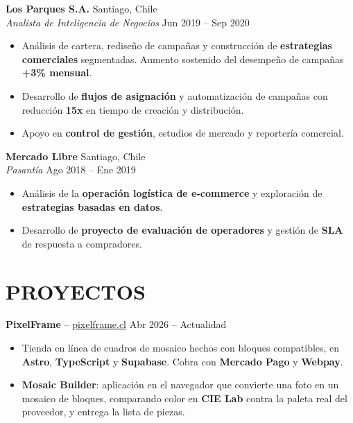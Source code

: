 \documentclass[a4paper,10.5pt]{extarticle}
\begin{document}
\vspace{4pt}

\textbf{Los Parques S.A.} \hfill Santiago, Chile\\
\textit{Analista de Inteligencia de Negocios} \hfill Jun 2019 -- Sep 2020
\begin{itemize}
    \item Análisis de cartera, rediseño de campañas y construcción de \textbf{estrategias comerciales} segmentadas. Aumento sostenido del desempeño de campañas \textbf{+3\% mensual}.
    \item Desarrollo de \textbf{flujos de asignación} y automatización de campañas con reducción \textbf{15x} en tiempo de creación y distribución.
    \item Apoyo en \textbf{control de gestión}, estudios de mercado y reportería comercial.
\end{itemize}

\vspace{4pt}

\textbf{Mercado Libre} \hfill Santiago, Chile\\
\textit{Pasantía} \hfill Ago 2018 -- Ene 2019
\begin{itemize}
    \item Análisis de la \textbf{operación logística de e-commerce} y exploración de \textbf{estrategias basadas en datos}.
    \item Desarrollo de \textbf{proyecto de evaluación de operadores} y gestión de \textbf{SLA} de respuesta a compradores.
\end{itemize}

\section*{PROYECTOS}

\textbf{PixelFrame} -- \href{https://pixelframe.cl}{pixelframe.cl} \hfill Abr 2026 -- Actualidad
\begin{itemize}
    \item Tienda en línea de cuadros de mosaico hechos con bloques compatibles, en \textbf{Astro}, \textbf{TypeScript} y \textbf{Supabase}. Cobra con \textbf{Mercado Pago} y \textbf{Webpay}.
    \item \textbf{Mosaic Builder}: aplicación en el navegador que convierte una foto en un mosaico de bloques, comparando color en \textbf{CIE Lab} contra la paleta real del proveedor, y entrega la lista de piezas.
\end{itemize}
\end{document}
